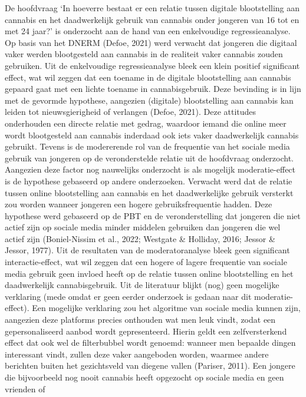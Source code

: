 \documentclass[
  letterpaper,
  DIV=11,
  numbers=noendperiod]{scrartcl}
\begin{document}
De hoofdvraag `In hoeverre bestaat er een relatie tussen digitale
blootstelling aan cannabis en het daadwerkelijk gebruik van cannabis
onder jongeren van 16 tot en met 24 jaar?' is onderzocht aan de hand van
een enkelvoudige regressieanalyse. Op basis van het DNERM (Defoe, 2021)
werd verwacht dat jongeren die digitaal vaker werden blootgesteld aan
cannabis in de realiteit vaker cannabis zouden gebruiken. Uit de
enkelvoudige regressieanalyse bleek een klein positief significant
effect, wat wil zeggen dat een toename in de digitale blootstelling aan
cannabis gepaard gaat met een lichte toename in cannabisgebruik. Deze
bevinding is in lijn met de gevormde hypothese, aangezien (digitale)
blootstelling aan cannabis kan leiden tot nieuwsgierigheid of verlangen
(Defoe, 2021). Deze attitudes onderhouden een directe relatie met
gedrag, waardoor iemand die online meer wordt blootgesteld aan cannabis
inderdaad ook iets vaker daadwerkelijk cannabis gebruikt. Tevens is de
modererende rol van de frequentie van het sociale media gebruik van
jongeren op de veronderstelde relatie uit de hoofdvraag onderzocht.
Aangezien deze factor nog nauwelijks onderzocht is als mogelijk
moderatie-effect is de hypothese gebaseerd op andere onderzoeken.
Verwacht werd dat de relatie tussen online blootstelling aan cannabis en
het daadwerkelijke gebruik versterkt zou worden wanneer jongeren een
hogere gebruiksfrequentie hadden. Deze hypothese werd gebaseerd op de
PBT en de veronderstelling dat jongeren die niet actief zijn op sociale
media minder middelen gebruiken dan jongeren die wel actief zijn
(Boniel-Nissim et al., 2022; Westgate \& Holliday, 2016; Jessor \&
Jessor, 1977). Uit de resultaten van de moderatoranalyse bleek geen
significant interactie-effect, wat wil zeggen dat een hogere of lagere
frequentie van sociale media gebruik geen invloed heeft op de relatie
tussen online blootstelling en het daadwerkelijk cannabisgebruik. Uit de
literatuur blijkt (nog) geen mogelijke verklaring (mede omdat er geen
eerder onderzoek is gedaan naar dit moderatie-effect). Een mogelijke
verklaring zou het algoritme van sociale media kunnen zijn, aangezien
deze platforms precies onthouden wat men leuk vindt, zodat een
gepersonaliseerd aanbod wordt gepresenteerd. Hierin geldt een
zelfversterkend effect dat ook wel de filterbubbel wordt genoemd:
wanneer men bepaalde dingen interessant vindt, zullen deze vaker
aangeboden worden, waarmee andere berichten buiten het gezichtsveld van
diegene vallen (Pariser, 2011). Een jongere die bijvoorbeeld nog nooit
cannabis heeft opgezocht op sociale media en geen vrienden of
\end{document}

